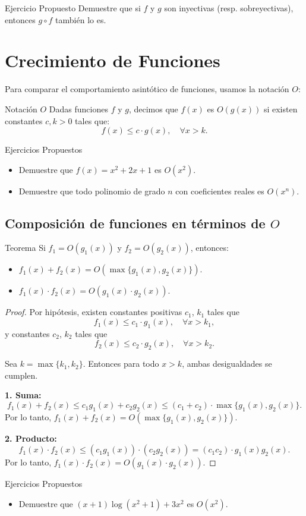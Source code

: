 \begin{exampleblock}{Ejercicio Propuesto}
Demuestre que si $f$ y $g$ son inyectivas (resp. sobreyectivas), entonces $g \circ f$ tambi\'en lo es.
\end{exampleblock}

\section{Crecimiento de Funciones}

Para comparar el comportamiento asint\'otico de funciones, usamos la notaci\'on $O$:

\begin{definitionblock}{Notaci\'on $O$}
Dadas funciones $f$ y $g$, decimos que $f(x)$ es $O(g(x))$ si existen constantes $c, k > 0$ tales que:
\[ f(x) \leq c \cdot g(x), \quad \forall x > k. \]
\end{definitionblock}

\begin{exampleblock}{Ejercicios Propuestos}
\begin{itemize}
\item Demuestre que $f(x) = x^2 + 2x + 1$ es $O(x^2)$.
\item Demuestre que todo polinomio de grado $n$ con coeficientes reales es $O(x^n)$.
\end{itemize}
\end{exampleblock}

\subsection{Composici\'on de funciones en t\'erminos de $O$}

\begin{thmblock}{Teorema}
Si $f_1 = O(g_1(x))$ y $f_2 = O(g_2(x))$, entonces:
\begin{itemize}
  \item $f_1(x) + f_2(x) = O(\max\{g_1(x), g_2(x)\})$.
  \item $f_1(x) \cdot f_2(x) = O(g_1(x) \cdot g_2(x))$.
\end{itemize}
\end{thmblock}
\begin{proof}
Por hipótesis, existen constantes positivas $c_1$, $k_1$ tales que
\[
f_1(x) \leq c_1 \cdot g_1(x), \quad \forall x > k_1,
\]
y constantes $c_2$, $k_2$ tales que
\[
f_2(x) \leq c_2 \cdot g_2(x), \quad \forall x > k_2.
\]

Sea $k = \max\{k_1, k_2\}$. Entonces para todo $x > k$, ambas desigualdades se cumplen.

\textbf{1. Suma:}
\[
f_1(x) + f_2(x) \leq c_1 g_1(x) + c_2 g_2(x) \leq (c_1 + c_2) \cdot \max\{g_1(x), g_2(x)\}.
\]
Por lo tanto, $f_1(x) + f_2(x) = O(\max\{g_1(x), g_2(x)\})$.

\textbf{2. Producto:}
\[
f_1(x) \cdot f_2(x) \leq (c_1 g_1(x)) \cdot (c_2 g_2(x)) = (c_1 c_2) \cdot g_1(x) g_2(x).
\]
Por lo tanto, $f_1(x) \cdot f_2(x) = O(g_1(x) \cdot g_2(x))$.
\end{proof}

\begin{exampleblock}{Ejercicios Propuestos}
\begin{itemize}
\item Demuestre que $(x + 1)\log(x^2 + 1) + 3x^2$ es $O(x^2)$.
\end{itemize}
\end{exampleblock}